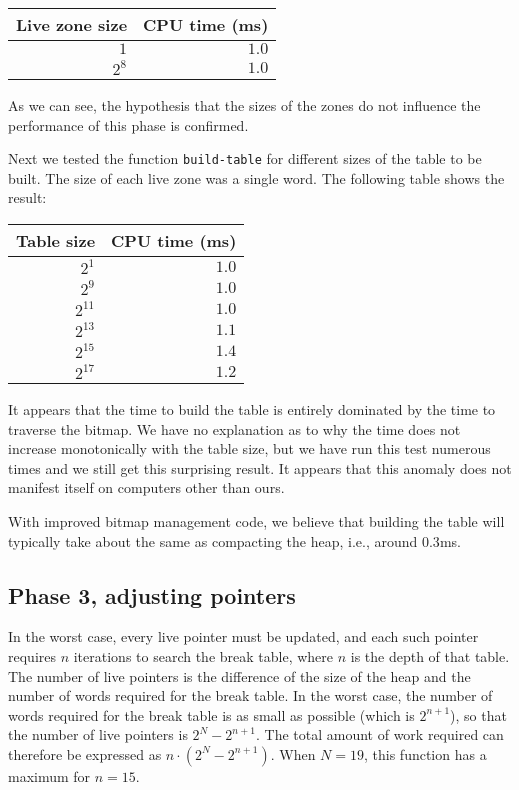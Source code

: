 \begin{tabular}{|r|r|}
\hline
Live zone size & CPU time (ms)\\
\hline
$1$ & $1.0$\\
$2^8$ & $1.0$\\
\hline
\end{tabular}

As we can see, the hypothesis that the sizes of the zones do not
influence the performance of this phase is confirmed.  

Next we tested the function \texttt{build-table} for different sizes
of the table to be built.  The size of each live zone was a single
word.  The following table shows the result:

\begin{tabular}{|r|r|}
\hline
Table size & CPU time (ms)\\
\hline
$2^{1}$ & $1.0$\\
$2^{9}$ & $1.0$\\
$2^{11}$ & $1.0$\\
$2^{13}$ & $1.1$\\
$2^{15}$ & $1.4$\\
$2^{17}$ & $1.2$\\
\hline
\end{tabular}

It appears that the time to build the table is entirely dominated by
the time to traverse the bitmap.  We have no explanation as to why the
time does not increase monotonically with the table size, but we have
run this test numerous times and we still get this surprising result.
It appears that this anomaly does not manifest itself on computers
other than ours.

With improved bitmap management code, we believe that building the
table will typically take about the same as compacting the heap, i.e.,
around $0.3$ms. 

\subsection{Phase 3, adjusting pointers}

In the worst case, every live pointer must be updated, and each such
pointer requires $n$ iterations to search the break table, where $n$
is the depth of that table.  The number of live pointers is the
difference of the size of the heap and the number of words required
for the break table.  In the worst case, the number of words required
for the break table is as small as possible (which is $2^{n+1}$), so
that the number of live pointers is $2^N - 2^{n+1}$.  The total amount
of work required can therefore be expressed as $n \cdot (2^N -
2^{n+1})$.  When $N = 19$, this function has a maximum for $n = 15$.

